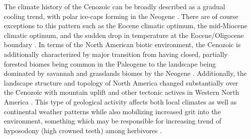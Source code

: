 \documentclass[12pt,letterpaper]{article}
\begin{document}
The climate history of the Cenozoic can be broadly described as a gradual cooling trend, with polar ice-caps forming in the Neogene \citep{Zachos2001,Zachos2008,Cramer2011}. There are of course exceptions to this pattern such as the Eocene climatic optimum, the mid-Miocene climatic optimum, and the sudden drop in temperature at the Eocene/Oligocene boundary \citep{Zachos2001,Zachos2008}. In terms of the North American biotic environment, the Cenozoic is additionally characterized by major transition from having closed, partially forested biomes being common in the Paleogene to the landscape being dominated by savannah and grasslands biomes by the Neogene \citep{Blois2009,Janis1993b,Janis2000,Stromberg2005}. Additionally, the landscape structure and topology of North America changed substantially over the Cenozoic with mountain uplift and other tectonic actives in Western North America \citep{Blois2009,Eronen2015,Janis2008a,Badgley2013}. This type of geological activity affects both local climates as well as continental weather patterns while also mobilizing increased grit into the environment, something which may be responsible for increasing trend of hyposodony (high crowned teeth) among herbivores \citep{Jardine2012,Jernvall2002,Damuth2011}.

\end{document}
